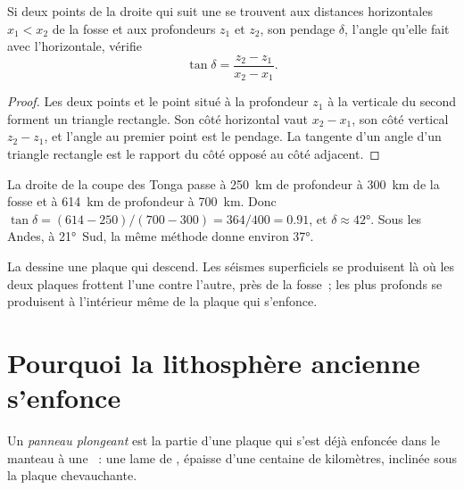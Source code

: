 \begin{proposition}\label{prop:g11:subduction-zones:dip}
Si deux points de la droite qui suit une  se trouvent
aux distances horizontales $x_1 < x_2$ de la fosse et aux profondeurs $z_1$
et $z_2$, son pendage $\delta$, l'angle qu'elle fait avec l'horizontale,
vérifie
\[
  \tan \delta = \frac{z_2 - z_1}{x_2 - x_1}.
\]
\end{proposition}

\begin{proof}
Les deux points et le point situé à la profondeur $z_1$ à la verticale du
second forment un triangle rectangle. Son côté horizontal vaut $x_2 - x_1$,
son côté vertical $z_2 - z_1$, et l'angle au premier point est le pendage.
La tangente d'un angle d'un triangle rectangle est le rapport du côté
opposé au côté adjacent.
\end{proof}

\begin{example}\label{ex:g11:subduction-zones:dip}
La droite de la coupe des Tonga passe à \qty{250}{km} de profondeur à
\qty{300}{km} de la fosse et à \qty{614}{km} de profondeur à
\qty{700}{km}. Donc
$\tan\delta = (614 - 250)/(700 - 300) = 364/400 = 0.91$, et
$\delta \approx \ang{42}$. Sous les Andes, à \ang{21}~Sud, la même méthode
donne environ \ang{37}.
\end{example}

La  dessine une plaque qui descend. Les séismes
superficiels se produisent là où les deux plaques frottent l'une contre
l'autre, près de la fosse~; les plus profonds se produisent à l'intérieur
même de la plaque qui s'enfonce.

\section{Pourquoi la lithosphère ancienne s'enfonce}

\begin{definition}\label{def:g11:subduction-zones:slab}
Un \emph{panneau plongeant} est la partie d'une
plaque qui s'est déjà enfoncée dans le manteau à une ~:
une lame de , épaisse d'une centaine de kilomètres,
inclinée sous la plaque chevauchante.
\end{definition}

